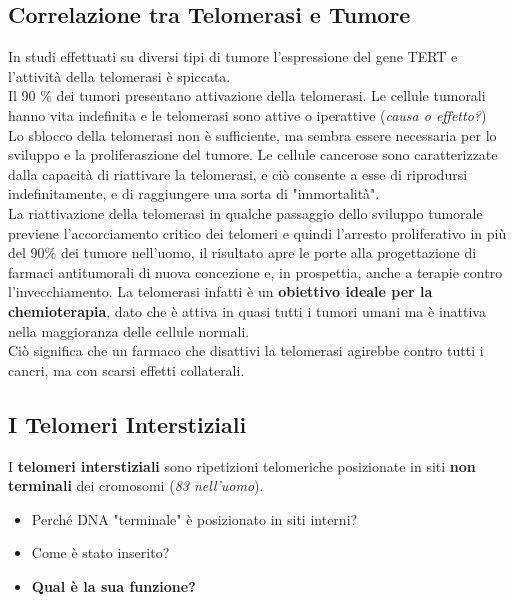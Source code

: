 \documentclass{article}
\begin{document}
\subsection{Correlazione tra Telomerasi e Tumore} In studi effettuati su diversi tipi di tumore l'espressione del gene TERT e l'attività della telomerasi è spiccata.\\
Il 90 $ \% $ dei tumori presentano attivazione della telomerasi. Le cellule tumorali hanno vita indefinita e le telomerasi sono attive o iperattive (\textit{causa o effetto?})\\
Lo sblocco della telomerasi non è sufficiente, ma sembra essere necessaria per lo sviluppo e la proliferaszione del tumore. Le cellule cancerose sono caratterizzate dalla capacità di riattivare la telomerasi,
e ciò consente a esse di riprodursi indefinitamente, e di raggiungere una sorta di "immortalità".\\
La riattivazione della telomerasi in qualche passaggio dello sviluppo tumorale previene l'accorciamento critico dei telomeri e quindi l'arresto proliferativo in più del 90$ \% $ dei tumore nell'uomo,
il risultato apre le porte alla progettazione di farmaci antitumorali di nuova concezione e, in prospettia, anche a terapie contro l'invecchiamento.
La telomerasi infatti è un \textbf{obiettivo ideale per la chemioterapia}, dato che è attiva in quasi tutti i tumori umani ma è inattiva nella maggioranza delle cellule normali.\\
Ciò significa che un farmaco che disattivi la telomerasi agirebbe contro tutti i cancri, ma con scarsi effetti collaterali.
\subsection{I Telomeri Interstiziali} I \textbf{telomeri interstiziali} sono ripetizioni telomeriche posizionate in siti \textbf{non terminali} dei cromosomi (\textit{83 nell'uomo}).\\
\begin{itemize}
    \item Perché DNA "terminale" è posizionato in siti interni?
    \item Come è stato inserito?
    \item \textbf{Qual è la sua funzione?}
\end{itemize}
\end{document}
